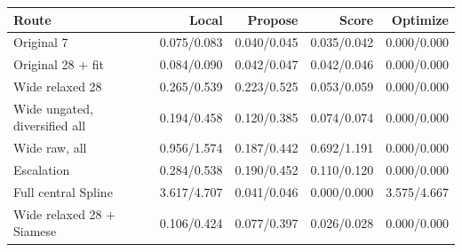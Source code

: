 \begin{tabular}{lrrrr}
\toprule
Route & Local & Propose & Score & Optimize \\
\midrule
Original 7 & 0.075/0.083 & 0.040/0.045 & 0.035/0.042 & 0.000/0.000 \\
Original 28 + fit & 0.084/0.090 & 0.042/0.047 & 0.042/0.046 & 0.000/0.000 \\
Wide relaxed 28 & 0.265/0.539 & 0.223/0.525 & 0.053/0.059 & 0.000/0.000 \\
Wide ungated, diversified all & 0.194/0.458 & 0.120/0.385 & 0.074/0.074 & 0.000/0.000 \\
Wide raw, all & 0.956/1.574 & 0.187/0.442 & 0.692/1.191 & 0.000/0.000 \\
Escalation & 0.284/0.538 & 0.190/0.452 & 0.110/0.120 & 0.000/0.000 \\
Full central Spline & 3.617/4.707 & 0.041/0.046 & 0.000/0.000 & 3.575/4.667 \\
Wide relaxed 28 + Siamese & 0.106/0.424 & 0.077/0.397 & 0.026/0.028 & 0.000/0.000 \\
\bottomrule
\end{tabular}
